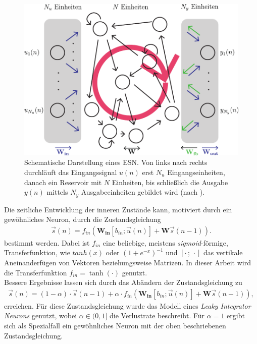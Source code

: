 \begin{figure}[h]
    \centering
    \includegraphics[width = 0.7 \textwidth]{figures/illustrations/esn_structure.pdf}
    \caption{Schematische Darstellung eines \textsc{ESN}. Von links nach rechts durchläuft das Eingangssignal $u(n)$ erst $N_u$ Eingangseinheiten, danach ein Reservoir mit $N$ Einheiten, bis schließlich die Ausgabe $y(n)$ mittels $N_y$ Ausgabeeinheiten gebildet wird (nach \citep{jeagerTut2002, Ma2013}).}
    \label{fig:esn_structure}
\end{figure}


Die zeitliche Entwicklung der inneren Zustände kann, motiviert durch ein gewöhnliches Neuron, durch die Zustandsgleichung
\begin{align}
\vec{s}(n) = f_{in}\left( \mathbf{W_{in}} [b_{in}; \vec{u}(n)] + \mathbf{W} \vec{s}(n-1) \right).
\end{align}
bestimmt werden. Dabei ist $f_{in}$ eine beliebige, meistens \textit{sigmoid}-förmige, Transferfunktion, wie $tanh(x)$ oder $(1+e^{-x})^{-1}$ und $[\cdot\,;\,\cdot]$ das vertikale Aneinanderfügen von Vektoren beziehungsweise Matrizen. In dieser Arbeit wird die Transferfunktion $f_{in} = \tanh(\cdot)$ genutzt.\\

Bessere Ergebnisse lassen sich durch das Abändern der Zustandsgleichung zu
\begin{align}
\label{eq:esn_stateeq}
\vec{s}(n) = (1 - \alpha) \cdot \vec{s}(n-1)  + \alpha \cdot f_{in}\left( \mathbf{W_{in}} [b_{in}; \vec{u}(n)] + \mathbf{W} \vec{s}(n-1) \right),
\end{align}
erreichen. Für diese Zustandsgleichung wurde das Modell eines \textit{Leaky Integrator Neurons} genutzt, wobei $\alpha \in (0,1]$ die Verlustrate beschreibt. Für $\alpha=1$ ergibt sich als Spezialfall ein gewöhnliches Neuron mit der oben beschriebenen Zustandsgleichung.\\

